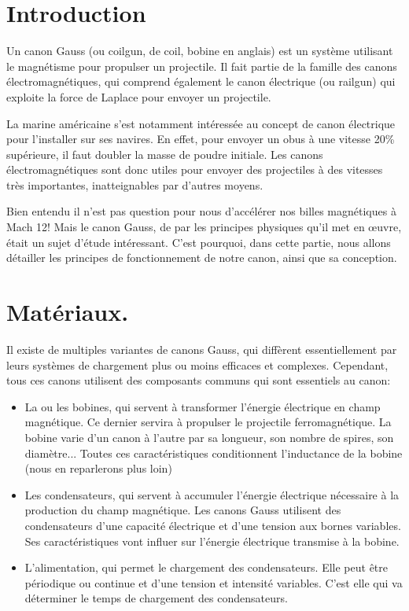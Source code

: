 \section{Introduction}
Un canon Gauss (ou coilgun, de coil, bobine en anglais) est un
système utilisant le magnétisme pour propulser un projectile.
Il fait partie de la famille des canons électromagnétiques, qui
comprend également le canon électrique (ou railgun) qui exploite
la force de Laplace pour envoyer un projectile.

La marine américaine s'est notamment intéressée au concept de
canon électrique pour l'installer sur ses navires. En effet,
pour envoyer un obus à une vitesse 20\% supérieure, il faut
doubler la masse de poudre initiale. Les canons
électromagnétiques sont donc utiles pour envoyer des
projectiles à des vitesses très importantes, inatteignables par
d'autres moyens.

Bien entendu il n'est pas question pour nous d'accélérer nos
billes magnétiques à Mach 12! Mais le canon Gauss, de par les
principes physiques qu'il met en œuvre, était un sujet d'étude
intéressant. C'est pourquoi, dans cette partie, nous allons
détailler les principes de fonctionnement de notre canon,
ainsi que sa conception.

\section{Matériaux.}
Il existe de multiples variantes de canons Gauss, qui diffèrent
essentiellement par leurs systèmes de chargement plus ou moins 
efficaces et complexes. Cependant, tous ces canons utilisent
des composants communs qui sont essentiels au canon:
\begin{itemize}
	\item La ou les bobines, qui servent à transformer l'énergie
		électrique en champ magnétique. Ce dernier servira à propulser
		le projectile ferromagnétique. La bobine varie d'un canon à
		l'autre par sa longueur, son nombre de spires, son diamètre...
		Toutes ces caractéristiques conditionnent l'inductance de la
		bobine (nous en reparlerons plus loin)

	\item Les condensateurs, qui servent à accumuler l'énergie électrique
		nécessaire à la production du champ magnétique. Les canons
		Gauss utilisent des condensateurs d'une capacité électrique et
		d'une tension aux bornes variables. Ses caractéristiques vont
		influer sur l'énergie électrique transmise à la bobine.

	\item L'alimentation, qui permet le chargement des condensateurs. Elle
		peut être périodique ou continue et d'une tension et intensité
		variables. C'est elle qui va déterminer le temps de chargement
		des condensateurs.
\end{itemize}

